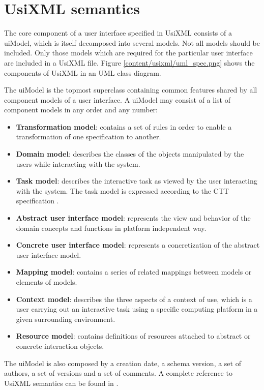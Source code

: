 \section{UsiXML semantics}
\label{section:usixml_semantics}

The core component of a user interface specified in UsiXML
consists of a uiModel, which is itself decomposed into several models. Not all models should be included. Only those models which are required for the particular user interface are included in a UsiXML file. Figure \ref{content/usixml/uml_spec.png} shows the components of UsiXML in an UML class diagram.


The uiModel is the topmost superclass containing common features shared by all component models of a user interface. A uiModel may consist of a list of component models in any order and any number:
\begin{itemize}
\item \textbf{Transformation model}: contains a set of rules in order to enable a transformation of one specification to another.
\item \textbf{Domain model}: describes the classes of the objects manipulated by the users while interacting with the system.
\item \textbf{Task model}: describes the interactive task as viewed by the user interacting with the system. The task model is expressed according to the CTT specification \cite{ConcurTaskTrees_A_Diagrammatic_Notation_for_Specifying_Task_Models}.
\item \textbf{Abstract user interface model}: represents the view and behavior of the domain concepts and functions in platform independent way.
\item \textbf{Concrete user interface model}: represents a concretization of the abstract user interface model.
\item \textbf{Mapping model}: contains a series of related mappings between models or elements of models.
\item \textbf{Context model}: describes the three aspects of a context of use, which is a user carrying out an interactive task using a specific computing platform in a given surrounding environment.
\item \textbf{Resource model}: contains definitions of resources attached to abstract or concrete interaction objects.
\end{itemize}
The uiModel is also composed by a creation date, a schema version, a set of authors, a set of versions and a set of comments. A complete reference to UsiXML semantics can be found in \cite{UsiXML_USer_Interface_eXtensible_Markup_Language}.